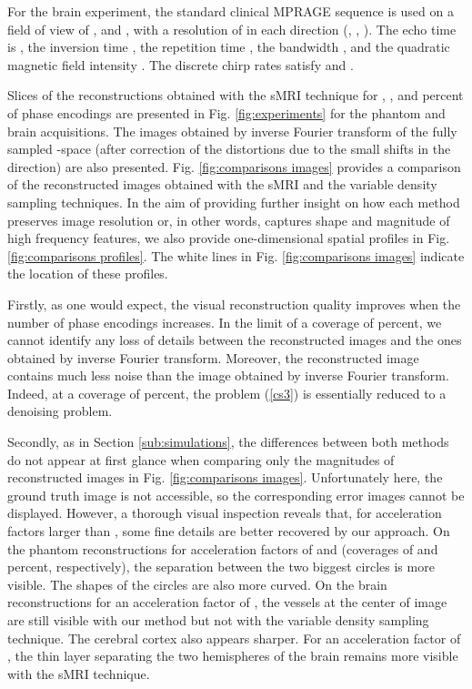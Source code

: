 \documentclass[10pt,draftcls, onecolumn]{IEEEtran}
\begin{document}
For the brain experiment, the standard clinical MPRAGE sequence is used on a field of view of ,  and , with a resolution of  in each direction (, , ). The echo time is , the inversion time , the repetition time , the bandwidth , and the quadratic magnetic field intensity . The discrete chirp rates satisfy  and .

Slices of the  reconstructions obtained with the sMRI technique for , ,  and  percent of phase encodings are presented in Fig. \ref{fig:experiments} for the phantom and brain acquisitions. The images obtained by inverse Fourier transform of the fully sampled -space (after correction of the distortions due to the small shifts in the  direction) are also presented. Fig. \ref{fig:comparisons images} provides a comparison of the reconstructed images obtained with the sMRI and the variable density sampling techniques. In the aim of providing further insight on how each method preserves image resolution or, in other words, captures shape and magnitude of high frequency features, we also provide one-dimensional spatial profiles in Fig. \ref{fig:comparisons profiles}. The white lines in Fig. \ref{fig:comparisons images} indicate the location of these profiles.

Firstly, as one would expect, the visual reconstruction quality improves when the number of phase encodings  increases. In the limit of a coverage of  percent, we cannot identify any loss of details between the reconstructed images and the ones obtained by inverse Fourier transform. Moreover, the reconstructed image contains much less noise than the image obtained by inverse Fourier transform. Indeed, at a coverage of  percent, the problem (\ref{cs3}) is essentially reduced to a denoising problem.

Secondly, as in Section \ref{sub:simulations}, the differences between both methods do not appear at first glance when comparing only the magnitudes of reconstructed images in Fig. \ref{fig:comparisons images}. Unfortunately here, the ground truth image is not accessible, so the corresponding error images cannot be displayed. However, a thorough visual inspection reveals that, for acceleration factors larger than , some fine details are better recovered by our approach. On the phantom reconstructions for acceleration factors of  and  (coverages of  and  percent, respectively), the separation between the two biggest circles is more visible. The shapes of the circles are also more curved. On the brain reconstructions for an acceleration factor of , the vessels at the center of image are still visible with our method but not with the variable density sampling technique. The cerebral cortex also appears sharper. For an acceleration factor of , the thin layer separating the two hemispheres of the brain remains more visible with the sMRI technique.
\end{document}
